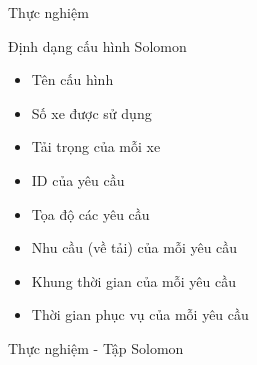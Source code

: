 \begin{frame}{Thực nghiệm}
  \begin{block}{Định dạng cấu hình Solomon}
    \begin{itemize}
      \item Tên cấu hình
      \item Số xe được sử dụng
      \item Tải trọng của mỗi xe
      \item ID của yêu cầu
      \item Tọa độ các yêu cầu
      \item Nhu cầu (về tải) của mỗi yêu cầu
      \item Khung thời gian của mỗi yêu cầu
      \item Thời gian phục vụ của mỗi yêu cầu
    \end{itemize}
  \end{block}
\end{frame}

\begin{frame}{Thực nghiệm - Tập Solomon}
  
\end{frame}
